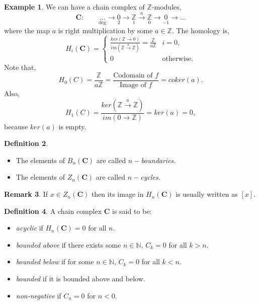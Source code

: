 \documentclass[11.5pt, twoside, a4paper, titlepage]{report}
\providecommand{\equ}[0]{\begin{equation*}}
\providecommand{\eequ}[0] {\end{equation*}}
\providecommand{\bb}[1]{\mathbb{#1}}
\theoremstyle{definition}
\newtheorem{mydef}{Definition}[section]
\newtheorem{rem}[mydef]{Remark}
\newtheorem{eg}[mydef]{Example}
\theoremstyle{plain}
\begin{document}
\begin{eg} \label{chainZeg}
We can have a chain complex of $\mathbb{Z}$-modules,
\equ
\mathbf{C}: \qquad \underset{\text{deg}}{\dots} \xrightarrow{}\underset{2}{0} \xrightarrow{} \underset{1}{\mathbb{Z}} \xrightarrow{a}\underset{0}{\mathbb{Z}} \xrightarrow{} \underset{-1}{0} \xrightarrow{}\dots 
\eequ
where the map $a$ is right multiplication by some $a \in \mathbb{Z}$. The homology is,
\equ
H_i(\mathbf{C}) = 
\begin{cases}
\frac{ker(\mathbb{Z}\xrightarrow{} 0)}{im(\mathbb{Z}\xrightarrow{a}\mathbb{Z})}=\frac{\mathbb{Z}}{a\mathbb{Z}} & i=0,\\
0 & \text{otherwise}.
\end{cases}
\eequ
Note that,
\equ
H_0(C)=\frac{\bb{Z}}{a\bb{Z}}= \frac{\text{Codomain of }f}{\text{Image of }f}=coker(a).
\eequ
Also,
\equ
H_1(C)=\frac{ker(\bb{Z}\xrightarrow{a}\bb{Z})}{im(0\xrightarrow{}\bb{Z})}=ker(a)=0,
\eequ
because $ker(a)$ is empty.
\end{eg}

\begin{mydef}
\begin{itemize}
\item The elements of $B_n(\mathbf{C})$ are called \emph{$n-$boundaries}.
\item The elements of $Z_n(\mathbf{C})$ are called \emph{$n-$cycles}.
\end{itemize}
\end{mydef}

\begin{rem} %
If $x\in Z_n(\mathbf{C})$ then its image in $H_n(\mathbf{C})$ is usually written as $[x]$.
\end{rem}

\begin{mydef}
A chain complex $\mathbf{C}$ is said to be:
\begin{itemize}
\item \emph{acyclic} if $H_n(\mathbf{C})=0$ for all $n$.
\item \emph{bounded above} if there exists some $n\in \mathbb{N}$, $C_k=0$ for all $k>n$.
\item \emph{bounded below} if for some $n \in \mathbb{N}$, $C_k=0$ for all $k<n$.
\item \emph{bounded} if it is bounded above and below.
\item \emph{non-negative}  if $C_n=0$ for $n<0$.
\end{itemize}
\end{mydef}
\end{document}
